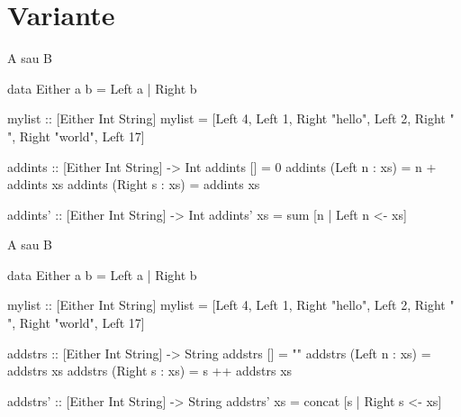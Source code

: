 \documentclass[xcolor=pdftex,romanian,colorlinks]{beamer}
\begin{document}
\section{Variante}

\begin{frame}[fragile]{A sau B}
\begin{asciihs}
  data Either a b = Left a | Right b


  mylist :: [Either Int String]
  mylist = [Left 4, Left 1, Right "hello", Left 2,
              Right " ", Right "world", Left 17]


  addints   :: [Either Int String] -> Int
  addints   []              = 0
  addints   (Left n : xs)   = n + addints xs
  addints   (Right s : xs) = addints xs


  addints' :: [Either Int String] -> Int
  addints' xs = sum [n | Left n <- xs]
\end{asciihs}
\end{frame}
\begin{frame}[fragile]{A sau B}
\begin{asciihs}
  data Either a b = Left a | Right b


  mylist :: [Either Int String]
  mylist = [Left 4, Left 1, Right "hello", Left 2,
              Right " ", Right "world", Left 17]


  addstrs   :: [Either Int String] -> String
  addstrs   []              = ""
  addstrs   (Left n : xs)   = addstrs xs
  addstrs   (Right s : xs) = s ++ addstrs xs


  addstrs' :: [Either Int String] -> String
  addstrs' xs = concat [s | Right s <- xs]
\end{asciihs}
\end{frame}
%
%
%
%
\end{document}
